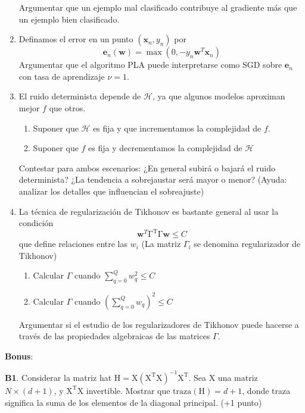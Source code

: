 \documentclass[	DIV=calc,%
							paper=a4,%
							fontsize=11pt]{scrartcl}	 					%
\begin{document}
\begin{enumerate}
Argumentar que un ejemplo mal clasificado contribuye  al gradiente más que un ejemplo bien clasificado.

  \item  Definamos el error en un punto $(\textbf{x}_n,y_n)$ por
    \[
    \textbf{e}_n(\textbf{w})=\max(0,-y_n\textbf{w}^T\textbf{x}_n)
    \]
    Argumentar que el algoritmo PLA puede interpretarse como SGD sobre $\textbf{e}_n$ con tasa de aprendizaje $\nu=1$.
    \item El ruido determinista depende de $\mathcal{H}$, ya que algunos modelos aproximan mejor $f$ que otros.
    \begin{enumerate}
        \item Suponer que $\mathcal{H}$ es fija y que incrementamos la complejidad de $f$.
        \item Suponer que $ f$ es fija y decrementamos la complejidad de $\mathcal{H}$
    \end{enumerate}
    Contestar para ambos escenarios: ¿En general subirá o bajará el ruido determinista? ¿La tendencia a sobrejaustar será mayor o menor? (Ayuda: analizar los detalles que influencian el sobreajuste)
    \item La técnica de regularización de Tikhonov es bastante general al usar la condición
    \[
    \textbf{w}^T\mathrm{\Gamma^T\Gamma}\textbf{w}\leq C
    \]
    que define relaciones entre las $w_i$ (La matriz $\Gamma_i$ se denomina regularizador de Tikhonov)
    \begin{enumerate}
    \item Calcular $\Gamma$ cuando $\sum_{q=0}^Q w_q^2 \leq C$
    \item Calcular $\Gamma$ cuando $(\sum_{q=0}^Q w_q)^2 \leq C$
    \end{enumerate}
    Argumentar si el estudio de los regularizadores de Tikhonov puede hacerse a través de las propiedades algebraicas de las matrices $\Gamma$.
    \end{enumerate}

    \textbf{Bonus}:

    \textbf{B1}. Considerar la matriz hat $\mathrm{H}=\mathrm{X(X^TX)^{-1}X^T}$. Sea $\mathrm{X}$ una matriz  $N\times (d+1)$, y $\mathrm{X^TX}$ invertible. Mostrar que $\mathrm{traza(H)}=d+1$, donde traza significa la suma de los elementos de la diagonal principal. (+1 punto)
\end{document}
